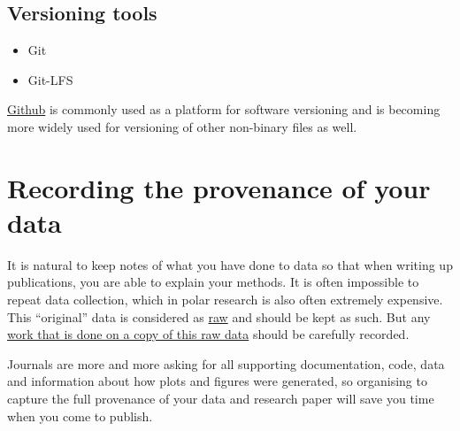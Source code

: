 \documentclass[a4paper,oneside]{report}
\providecommand{\tightlist}{%
  \setlength{\itemsep}{0pt}\setlength{\parskip}{0pt}}
\begin{document}
\hypertarget{versioning-tools}{%
\subsection{Versioning tools}\label{versioning-tools}}

\begin{itemize}
\tightlist
\item
  Git
\item
  Git-LFS
\end{itemize}

\href{https://github.com/}{Github} is commonly used as a platform for
software versioning and is becoming more widely used for versioning of
other non-binary files as well.

\hypertarget{recording-the-provenance-of-your-data}{%
\section{Recording the provenance of your
data}\label{recording-the-provenance-of-your-data}}

It is natural to keep notes of what you have done to data so that when
writing up publications, you are able to explain your methods. It is
often impossible to repeat data collection, which in polar research is
also often extremely expensive. This ``original'' data is considered as
\protect\hyperlink{raw-data}{raw} and should be kept as such. But any
\protect\hyperlink{work-on-a-copy-of-your-raw-data}{work that is done on
a copy of this raw data} should be carefully recorded.

Journals are more and more asking for all supporting documentation,
code, data and information about how plots and figures were generated,
so organising to capture the full provenance of your data and research
paper will save you time when you come to publish.
\end{document}
